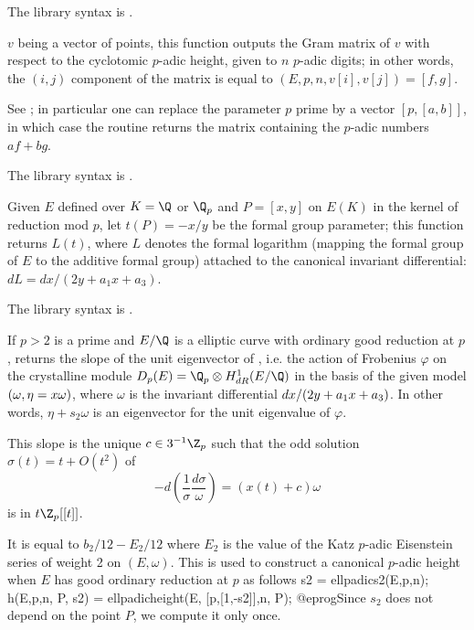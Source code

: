 The library syntax is .

\label{se:ellpadicheightmatrix}
$v$ being a vector of points, this function outputs the Gram matrix of
$v$ with respect to the cyclotomic $p$-adic height, given to $n$ $p$-adic
digits; in other words, the $(i,j)$ component of the matrix is equal to
$(E,p,n, v[i],v[j]) = [f,g]$.

See ; in particular one can replace the parameter $p$
prime by a vector $[p,[a,b]]$, in which case the routine returns the matrix
containing the $p$-adic numbers $af + bg$.

The library syntax is .

\label{se:ellpadiclog}
Given $E$ defined over $K = \Q$ or $\Q_p$ and $P = [x,y]$ on $E(K)$ in the
kernel of reduction mod $p$, let $t(P) = -x/y$ be the formal group
parameter; this function returns $L(t)$, where $L$ denotes the formal
logarithm (mapping the formal group of $E$  to the additive formal group)
attached to the canonical invariant differential:
$dL = dx/(2y + a_1x + a_3)$.

The library syntax is .

\label{se:ellpadics2}
If $p>2$ is a prime and $E/\Q$ is a elliptic curve with ordinary good
reduction at $p$, returns the slope of the unit eigenvector
of , i.e. the action of Frobenius $\varphi$ on
the crystalline module $D_p(E)= \Q_p \otimes H^1_{dR}(E/\Q)$ in the basis of
the given model $(\omega, \eta=x\*\omega)$, where $\omega$ is the invariant
differential $dx/(2\*y+a_1\*x+a_3)$. In other words, $\eta + s_2\omega$
is an eigenvector for the unit eigenvalue of $\varphi$.

This slope is the unique $c \in 3^{-1}\Z_p$ such that the odd solution
  $\sigma(t) = t + O(t^2)$ of
$$ - d(\dfrac{1}{\sigma} \dfrac{d \sigma}{\omega})
 = (x(t) + c) \omega$$
is in $t\Z_p[[t]]$.

It is equal to $b_2/12 - E_2/12$ where $E_2$ is the value of the Katz
$p$-adic Eisenstein series of weight 2 on $(E,\omega)$. This is
used to construct a canonical $p$-adic height when $E$ has good ordinary
reduction at $p$ as follows
\bprog
s2 = ellpadics2(E,p,n);
h(E,p,n, P, s2) = ellpadicheight(E, [p,[1,-s2]],n, P);
@eprog\noindent Since $s_2$ does not depend on the point $P$, we compute it
only once.

